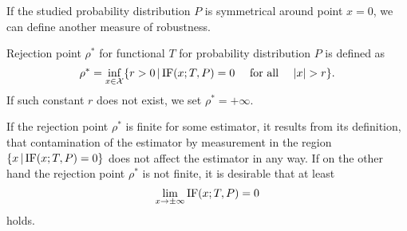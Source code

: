 If the studied probability distribution $P$ is symmetrical around point $x=0$, we can define another measure of robustness.

\begin{definition}
	Rejection point $\rho^*$ for functional $T$ for probability distribution $P$ is defined as 
	\begin{equation}
			\rho^* = \inf_{x \in \mathcal{X}} \lbrace r>0 \, | \, \mathrm{IF}({x};T,P) = 0 \quad \text{ for all }\quad |x| > r\rbrace.
	\end{equation}
	If such constant $r$  does not exist, we set $\rho^* = + \infty.$ 
\end{definition}

If the rejection point $\rho^*$ is finite for some estimator, it results from its definition, that contamination of the estimator by measurement in the region  $\lbrace x \, | \, \mathrm{IF}({x};T,P) = 0 \rbrace$ does not affect the estimator in any way. If on the other hand the rejection point $\rho^*$ is not finite, it is desirable that at least
\begin{equation}
	\lim_{x \rightarrow \pm\infty} \mathrm{IF}({x};T,P) = 0
\end{equation}
holds.

